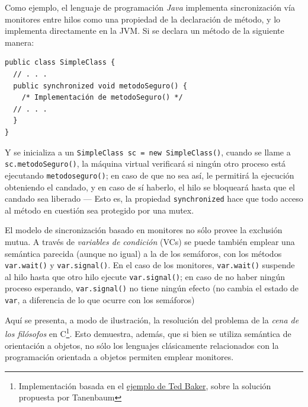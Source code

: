 \documentclass[11pt,fleqn]{book} %
\begin{document}
Como ejemplo, el lenguaje de programación \emph{Java} implementa
sincronización vía monitores entre hilos como una propiedad de la
declaración de método, y lo implementa directamente en la JVM. Si
se declara un método de la siguiente manera:


\begin{verbatim}
public class SimpleClass {
  // . . .
  public synchronized void metodoSeguro() {
    /* Implementación de metodoSeguro() */
  // . . .
  }
}
\end{verbatim}

Y se inicializa a un \texttt{SimpleClass sc = new SimpleClass()}, cuando
se llame a \texttt{sc.metodoSeguro()}, la máquina virtual verificará si ningún
otro proceso está ejecutando \texttt{metodoseguro()}; en caso de que no sea
así, le permitirá la ejecución obteniendo el candado, y en caso de sí
haberlo, el hilo se bloqueará hasta que el candado sea liberado — Esto
es, la propiedad \texttt{synchronized} hace que todo acceso al método en
cuestión sea protegido por una mutex.

El modelo de sincronización basado en monitores no sólo provee la
exclusión mutua. A través de \emph{variables de condición} (VCs) se puede
también emplear una semántica parecida (aunque no igual) a la de los
semáforos, con los métodos \texttt{var.wait()} y \texttt{var.signal()}. En el caso
de los monitores, \texttt{var.wait()} suspende al hilo hasta que otro hilo
ejecute \texttt{var.signal()}; en caso de no haber ningún proceso esperando,
\texttt{var.signal()} no tiene ningún efecto (no cambia el estado de \texttt{var}, a
diferencia de lo que ocurre con los semáforos)

Aquí se presenta, a modo de ilustración, la resolución del problema de
la \emph{cena de los filósofos} en C\footnote{Implementación basada en el
\href{http://www.cs.fsu.edu/~baker/realtime/restricted/notes/philos.html}{ejemplo de Ted Baker}, sobre la solución propuesta por Tanenbaum }. Esto
demuestra, además, que si bien se utiliza semántica de orientación a
objetos, no sólo los lenguajes clásicamente relacionados con la
programación orientada a objetos permiten emplear monitores.
\end{document}
